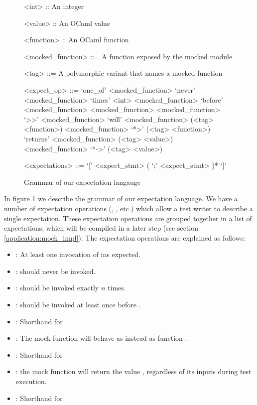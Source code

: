 \begin{figure}
  \begin{grammar}
    <int> :: An integer

    <value> :: An OCaml value

    <function> :: An OCaml function

    <mocked\_function> ::= A function exposed by the mocked module

    <tag> ::= A polymorphic variant that names a mocked function

    <expect\_op> ::=
    `one\_of' <mocked\_function>
    \alt `never' <mocked\_function>
    \alt `times' <int> <mocked\_function>
    \alt `before' <mocked\_function> <mocked\_function>
    \alt <mocked\_function> `>>' <mocked\_function>
    \alt `will' <mocked\_function> (<tag> <function>)
    \alt  <mocked\_function> `*>' (<tag> <function>)
    \alt `returns' <mocked\_function> (<tag> <value>)
    \alt <mocked\_function> `*->' (<tag> <value>)

    <expectations> ::= `[' <expect\_stmt> ( `;' <expect\_stmt> )* `]'
  \end{grammar}

  \caption{Grammar of our expectation langauge}
  \label{code:syntax}
\end{figure}

In figure \ref{code:syntax} we describe the grammar of our expectation
language. We have a number of expectation operations (,
, etc.) which allow a test writer to describe a single
expectation. These expectation operations are grouped together in a
list of expectations, which will be compiled in a later step (see
section \ref{application:mock_impl}). The expectation operations are
explained as follows:

\begin{itemize}
\item {}: At least one invocation of  ins
  expected.
\item {}:  should never be invoked.
\item {}:  should be invoked exactly $n$
  times.
\item {}:  should be invoked at least once
  before .
\item {}: Shorthand for 
\item {}: The mock function  will behave as
  instead as function .
\item {}: Shorthand for 
\item {}: the mock function  will return the
  value , regardless of its inputs during test execution.
\item {}: Shorthand for 
\end{itemize}

